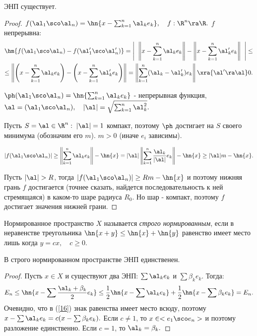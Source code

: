 \documentclass{article}
\begin{document}
\begin{theorem}
ЭНП существует.
\end{theorem}
\begin{proof}

  $f(\al_1\sco \al_n)=\hn{x-\sum_{k=1}^n \al_k e_k},\quad
  f:\R ^n\ra \R .$ $f$ непрерывна:
  \begin{multline*}
    \hm{f(\al_1\sco \al_n)-f(\al_1'\sco \al_n')}=\left|\;\;\left\|x-\sum_{k=1}^n
    \al_k e_k\right\|-\left\|x-\sum_{k=1}^n \al_k'
    e_k\right\|\;\;\right|\le\\
    \le\left\|\left(x-\sum_{k=1}^n \al_k
    e_k\right)-\left(x-\sum_{k=1}^n \al_k'
    e_k\right)\right\|=\left\|\sum_{k=1}^n (\al_k-\al_k')
    e_k\right\|\xra{\al'\ra\al}0.
  \end{multline*}

  $\ph(\al_1\sco \al_n)=\hn{\sum_{k=1}^n \al_k e_k}$
  - непрерывная функция, $\al=(\al_1\sco \al_n),\quad|\al|=\sqrt{\sum_{k=1}^n\al_k^2}.$

  Пусть $S={\al\in\R ^n:\;|\al|=1}$ компакт, поэтому
  $\ph$ достигает на $S$ своего минимума (обозначим его $m$). $m>0$
  (иначе $e_i$ зависимы).

  $$|f(\al_1\sco \al_n)|\ge\left\|\sum_{k=1}^n \al_k
  e_k\right\|-\hn{x}=|\al|\left\|\sum_{k=1}^n
  \frac{\al_k}{|\al|} e_k\right\|-\hn{x}\ge|\al| m-\hn{x}.$$

  Пусть $|\al|>R$, тогда $|f(\al_1\sco \al_n)|\ge
  Rm-\hn{x}$ и поэтому нижняя грань $f$ достигается (точнее сказать,
  найдется последовательность к ней стремящаяся) в каком-то шаре
  радиуса $R_0$. Но шар - компакт, поэтому $f$ достигает значения
  нижней грани.
\end{proof}

\begin{df}
  Нормированное пространство $X$ называется \emph{строго нормированным}, если в
  неравенстве треугольника $\hn{x+y}\le\hn{x}+\hn{y}$ равенство имеет место лишь когда $y=cx, \quad c\ge0$.
\end{df}

\begin{theorem} В строго нормированном пространстве ЭНП
единственен.
\end{theorem}
\begin{proof}
  Пусть $x\in X$ и существуют два ЭНП:
  $\sum\al_k e_k$ и $\sum\beta_k e_k.$ Тогда:
  \begin{equation}\label{16}
    E_n\le\hn{x-\sum\frac{\al_k+\beta_k}2e_k}\le\frac12\hn{x-\sum\al_k e_k}+\frac12\hn{x-\sum\beta_k e_k}=E_n.
  \end{equation}
  Очевидно, что в (\ref{16}) знак равенства имеет место всюду,
  поэтому $x-\sum\al_k e_k=c(x-\sum\beta_k e_k).$ Если $c\neq1$,
  то $x\in<e_1\sco e_n>$ и поэтому разложение единственно. Если
  $c=1$, то $\al_k=\beta_k.$
\end{proof}
\end{document}
